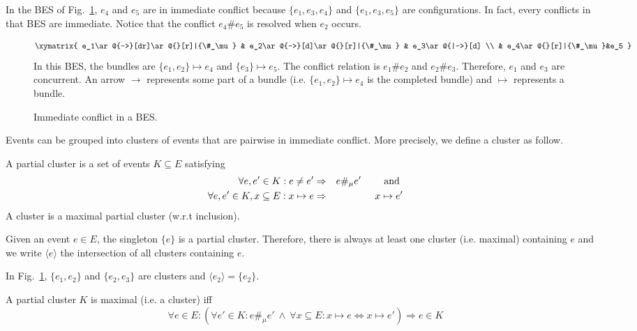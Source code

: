 \documentclass{llncs}
\newcommand{\<}{\langle}
\renewcommand{\>}{\rangle}
\begin{document}
\begin{example}
In the BES of Fig.~\ref{fig:example}, $e_4$ and $e_5$ are in immediate conflict because $\{e_1,e_3,e_4\}$ and $\{e_1,e_3,e_5\}$ are configurations. In fact, every conflicts in that BES are immediate. Notice that the conflict $e_4\#e_5$ is resolved  when $e_2$ occurs. 
\begin{figure}[h!]
\begin{displaymath}
\xymatrix{
e_1\ar@{->}[dr]\ar@{}[r]|{\#_\mu} & e_2\ar@{->}[d]\ar@{}[r]|{\#_\mu}  & e_3\ar@{|->}[d] \\
& e_4\ar@{}[r]|{\#_\mu}&e_5
}
\end{displaymath}
In this BES, the bundles are $\{e_1,e_2\}\mapsto e_4$ and $\{e_3\}\mapsto e_5$. The conflict relation is $e_1\# e_2$ and $e_2\# e_3$. Therefore, $e_1$ and $e_3$ are concurrent. An arrow $\rightarrow$ represents some part of a bundle (i.e. $\{e_1,e_2\}\mapsto e_4$ is the completed bundle) and $\mapsto$ represents a bundle.
\caption{Immediate conflict in a BES.}\label{fig:example}
\end{figure}
\end{example}


Events can be grouped into clusters of events that are pairwise in immediate conflict. More precisely, we define a cluster as follow.
\begin{definition}\label{def:cluster}
A partial cluster is a set of events $K\subseteq E$ satisfying
\begin{eqnarray}
\forall e,e'\in K: e\neq e\rq{}&\Rightarrow &e\#_\mu e'\qquad\textrm{ and }\nonumber\\
\forall e,e'\in K,x\subseteq E: x\mapsto e&\Rightarrow &x\mapsto e'\nonumber\label{eq:equally-pointed}
\end{eqnarray}
A cluster is a maximal partial cluster (w.r.t inclusion).
\end{definition}


Given an event $e\in E$, the singleton $\{e\}$ is a partial cluster. Therefore, there is always at least one cluster (i.e. maximal) containing $e$ and we write $\<e\>$ the intersection of all clusters containing $e$. 

\begin{example}
In Fig.~\ref{fig:example}, $\{e_1,e_2\}$ and $\{e_2,e_3\}$ are clusters and $\<e_2\> = \{e_2\}$. 
\end{example}

\begin{proposition}
A partial cluster $K$ is maximal (i.e. a cluster) iff
$$
\forall e\in E:(\forall e'\in K:e\#_\mu e'\ \wedge\ \forall x\subseteq E: x\mapsto e\Leftrightarrow x\mapsto e')\Rightarrow e\in K\nonumber
$$
\end{proposition}
\end{document}
